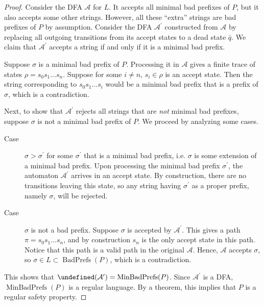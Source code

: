 \documentclass[letterpaper,11pt]{article}
\DeclareMathOperator{\MBP}{MinBadPrefs}
\DeclareMathOperator{\BP}{BadPrefs}
\let\L\undefined
\DeclareMathOperator{\L}{\mathcal{L}}
\begin{document}
\begin{proof}
    Consider the DFA $\mathcal{A}$ for $L$. It accepts all minimal bad prefixes
    of $P$, but it also accepts some other strings. However, all these
    ``extra'' strings are bad prefixes of $P$ by assumption. Consider the DFA
    $\mathcal{A}^\prime$ constructed from $\mathcal{A}$ by replacing all
    outgoing transitions from its accept states to a dead state $\bar q$.
    We claim that $\mathcal{A}^\prime$ accepts a string if and only if it is a
    minimal bad prefix.

    Suppose $\sigma$ is a minimal bad prefix of $P$. Processing it in
    $\mathcal{A}$ gives a finite trace of states $\rho = s_0 s_1 \ldots s_n$.
    Suppose for some $i \neq n$, $s_i \in \rho$ is an accept state. Then the
    string corresponding to $s_0 s_1 \ldots s_i$ would be a minimal bad prefix
    that is a prefix of $\sigma$, which is a contradiction.

    Next, to show that $\mathcal{A}^\prime$ rejects all strings that are
    \emph{not} minimal bad prefixes, suppose $\sigma$ is not a minimal bad
    prefix of $P$.  We proceed by analyzing some cases.
    \begin{description}
        \item[Case] $\sigma > \sigma^\prime$ for some $\sigma^\prime$ that is a
            minimal bad prefix, i.e. $\sigma$ is some extension of a minimal
            bad prefix.
            Upon processing the minimal bad prefix $\sigma^\prime$, the
            automaton $\mathcal{A}^\prime$ arrives in an accept state. By
            construction, there are no transitions leaving this state, so any
            string having $\sigma^\prime$ as a proper prefix, namely $\sigma$,
            will be rejected.

        \item[Case] $\sigma$ is not a bad prefix. Suppose $\sigma$ is accepted
            by $\mathcal{A}^\prime$. This gives a path
            $\pi = s_0 s_1 \ldots s_n$, and by construction $s_n$ is the only
            accept state in this path. Notice that this path is a valid path in
            the original $\mathcal{A}$. Hence, $\mathcal{A}$ accepts $\sigma$,
            so $\sigma \in L \subset \BP(P)$, which is a contradiction.
    \end{description}

    This shows that $\L(\mathcal{A}^\prime) = \MBP(P)$. Since
    $\mathcal{A}^\prime$ is a DFA, $\MBP(P)$ is a regular language. By a
    theorem, this implies that $P$ is a regular safety property.
\end{proof}
\end{document}
